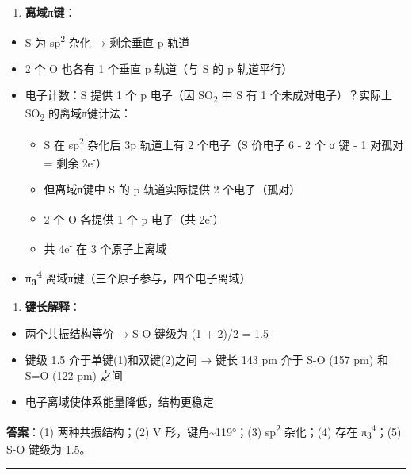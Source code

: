 \documentclass[a4paper,11pt]{ctexart}
\providecommand{\tightlist}{\setlength{\itemsep}{0pt}\setlength{\parskip}{0pt}}
\begin{document}
\begin{enumerate}
\def\labelenumi{(\arabic{enumi})}
\setcounter{enumi}{3}
\tightlist
\item
  \textbf{离域π键}：
\end{enumerate}

\begin{itemize}
\tightlist
\item
  S 为 sp\textsuperscript{2} 杂化 → 剩余垂直 p 轨道
\item
  2 个 O 也各有 1 个垂直 p 轨道（与 S 的 p 轨道平行）
\item
  电子计数：S 提供 1 个 p 电子（因 SO\textsubscript{2} 中 S 有 1 个未成对电子）？实际上 SO\textsubscript{2} 的离域π键计法：

  \begin{itemize}
  \tightlist
  \item
    S 在 sp\textsuperscript{2} 杂化后 3p 轨道上有 2 个电子（S 价电子 6 - 2 个 σ 键 - 1 对孤对 = 剩余 2e\textsuperscript{-}）
  \item
    但离域π键中 S 的 p 轨道实际提供 2 个电子（孤对）
  \item
    2 个 O 各提供 1 个 p 电子（共 2e\textsuperscript{-}）
  \item
    共 4e\textsuperscript{-} 在 3 个原子上离域
  \end{itemize}
\item
  \textbf{π\textsubscript{3}\textsuperscript{4}} 离域π键（三个原子参与，四个电子离域）
\end{itemize}

\begin{enumerate}
\def\labelenumi{(\arabic{enumi})}
\setcounter{enumi}{4}
\tightlist
\item
  \textbf{键长解释}：
\end{enumerate}

\begin{itemize}
\tightlist
\item
  两个共振结构等价 → S-O 键级为 (1 + 2)/2 = 1.5
\item
  键级 1.5 介于单键(1)和双键(2)之间 → 键长 143 pm 介于 S-O (157 pm) 和 S=O (122 pm) 之间
\item
  电子离域使体系能量降低，结构更稳定
\end{itemize}

\textbf{答案}：(1) 两种共振结构；(2) V 形，键角\textasciitilde119°；(3) sp\textsuperscript{2} 杂化；(4) 存在 π\textsubscript{3}\textsuperscript{4}；(5) S-O 键级为 1.5。

\begin{center}\rule{0.5\linewidth}{0.5pt}\end{center}
\end{document}
